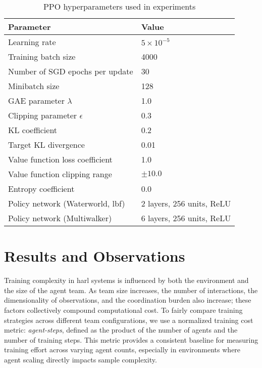 \begin{table}[ht]
    \centering
    \caption{PPO hyperparameters used in experiments}
    \begin{tabular}{ll}
    \toprule
    \textbf{Parameter} & \textbf{Value} \\
    \midrule
    Learning rate & $5 \times 10^{-5}$ \\
    Training batch size & 4000 \\
    Number of SGD epochs per update & 30 \\
    Minibatch size & 128 \\
    GAE parameter $\lambda$ & 1.0 \\
    Clipping parameter $\epsilon$ & 0.3 \\
    KL coefficient & 0.2 \\
    Target KL divergence & 0.01 \\
    Value function loss coefficient & 1.0 \\
    Value function clipping range & $\pm 10.0$ \\
    Entropy coefficient & 0.0 \\
    Policy network (Waterworld, \gls{lbf}) & 2 layers, 256 units, ReLU \\%
    Policy network (Multiwalker) & 6 layers, 256 units, ReLU \\%
    \bottomrule
    \end{tabular}
    \label{con1:tab:ppo-hyperparams}
\end{table}

\FloatBarrier
\section{Results and Observations}
\label{con1:sec:results}

Training complexity in \gls{harl}
systems is influenced by both the environment and the size of the agent team. 
As team size increases, the number of interactions, the dimensionality of observations, 
and the coordination burden also increase; these factors collectively 
compound computational cost. To fairly compare training strategies across different 
team configurations, we use a normalized training cost metric: \emph{agent-steps}, 
defined as the product of the number of agents and the number of training steps. 
This metric provides a consistent baseline for measuring training effort across 
varying agent counts, especially in environments where agent scaling directly 
impacts sample complexity.

